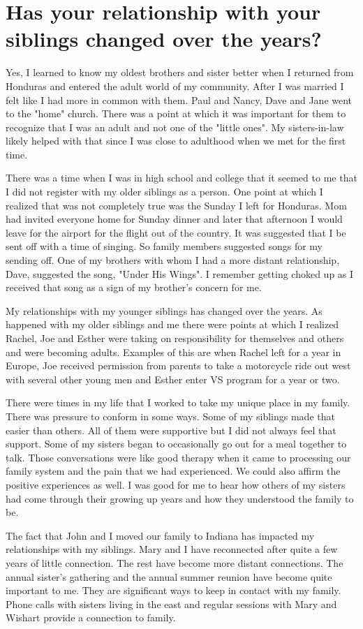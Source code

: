 \section{Has your relationship with your siblings changed over the years?}
Yes, I learned to know my oldest brothers and sister better when I returned from Honduras and entered the adult world of my community.
After I was married I felt like I had more in common with them.
Paul and Nancy, Dave and Jane went to the "home" church.
There was a point at which it was important for them to recognize that I was an adult and not one of the "little ones".
My sisters-in-law likely helped with that since I was close to adulthood when we met for the first time.

There was a time when I was in high school and college that it seemed to me that I did not register with my older siblings as a person.
One point at which I realized that was not completely true was the Sunday I left for Honduras.
Mom had invited everyone home for Sunday dinner and later that afternoon I would leave for the airport for the flight out of the country.
It was suggested that I be sent off with a time of singing.
So family members suggested songs for my sending off.
One of my brothers with whom I had a more distant relationship, Dave, suggested the song, "Under His Wings".
I remember getting choked up as I received that song as a sign of my brother's concern for me.

My relationships with my younger siblings has changed over the years.
As happened with my older siblings and me there were points at which I realized Rachel, Joe and Esther were taking on responsibility for themselves and others and were becoming adults.
Examples of this are when Rachel left for a year in Europe, Joe received permission from parents to take a motorcycle ride out west with several other young men and Esther enter VS program for a year or two.

There were times in my life that I worked to take my unique place in my family.
There was pressure to conform in some ways.
Some of my siblings made that easier than others.
All of them were supportive but I did not always feel that support.
Some of my sisters began to occasionally go out for a meal together to talk.
Those conversations were like good therapy when it came to processing our family system and the pain that we had experienced.
We could also affirm the positive experiences as well.
I was good for me to hear how others of my sisters had come through their growing up years and how they understood the family to be.

The fact that John and I moved our family to Indiana has impacted my relationships with my siblings.
Mary and I have reconnected after quite a few years of little connection.
The rest have become more distant connections.
The annual sister's gathering and the annual summer reunion have become quite important to me.
They are significant ways to keep in contact with my family.
Phone calls with sisters living in the east and regular sessions with Mary and Wishart provide a connection to family.






